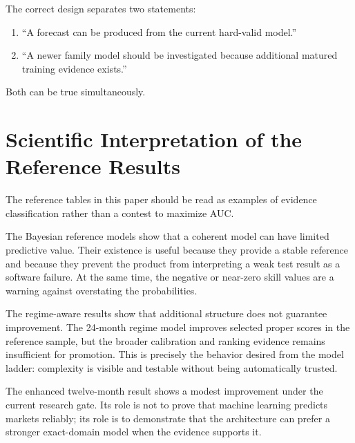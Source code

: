 \documentclass[11pt]{article}
\begin{document}
The correct design separates two statements:
\begin{enumerate}[itemsep=0.2em]
\item ``A forecast can be produced from the current hard-valid model.''
\item ``A newer family model should be investigated because additional matured training evidence exists.''
\end{enumerate}
Both can be true simultaneously.

\section{Scientific Interpretation of the Reference Results}
The reference tables in this paper should be read as examples of evidence classification rather than a contest to maximize AUC.

The Bayesian reference models show that a coherent model can have limited predictive value. Their existence is useful because they provide a stable reference and because they prevent the product from interpreting a weak test result as a software failure. At the same time, the negative or near-zero skill values are a warning against overstating the probabilities.

The regime-aware results show that additional structure does not guarantee improvement. The 24-month regime model improves selected proper scores in the reference sample, but the broader calibration and ranking evidence remains insufficient for promotion. This is precisely the behavior desired from the model ladder: complexity is visible and testable without being automatically trusted.

The enhanced twelve-month result shows a modest improvement under the current research gate. Its role is not to prove that machine learning predicts markets reliably; its role is to demonstrate that the architecture can prefer a stronger exact-domain model when the evidence supports it.
\end{document}
